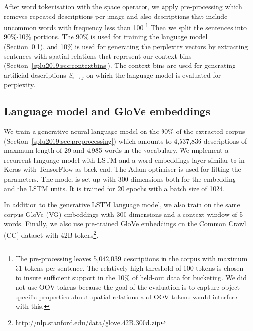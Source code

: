 After word
tokenisation with the space operator, we apply pre-processing which removes
repeated descriptions per-image and also descriptions that include uncommon
words with frequency less than 100%
\footnote{The pre-processing leaves 5,042,039 descriptions in the corpus with maximum 31 tokens per sentence. The relatively high threshold of 100 tokens is chosen to insure sufficient support in the 10\% of held-out data for bucketing. We did not use OOV tokens because the goal of the evaluation is to capture object-specific properties about spatial relations and OOV tokens would interfere with this.} %
Then we split the sentences into 90\%-10\%
portions. The 90\% is used for training the language model
(Section~\ref{splu2019:sec:training}), and 10\% is used for generating the perplexity
vectors by extracting sentences with spatial relations that represent our
context bins (Section~\ref{splu2019:sec:contextbins}). The context bins are used for
generating artificial descriptions $S_{i \to j}$ on which the language model is
evaluated for perplexity.%

\subsection{Language model and GloVe embeddings}\label{splu2019:sec:training}

We train a generative neural language model on the 90\% of the extracted corpus
(Section~\ref{splu2019:sec:preprocessing}) which amounts to 4,537,836 descriptions of
maximum length of 29 and 4,985 words in the vocabulary. We implement a
recurrent language model with LSTM \cite{hochreiter1997long} and a word
embeddings layer similar to \citet{gal2016theoretically} in Keras
\cite{chollet2015keras} with TensorFlow \cite{tensorflow2015-whitepaper} as
back-end.
The Adam optimiser \cite{kingma2014adam} is used for fitting the parameters.
The model is set up with 300 dimensions both for the embedding- and the LSTM
units. It is trained for 20 epochs with a batch size of 1024.

In addition to the generative LSTM language model, we also train on the same
corpus GloVe (VG) embeddings with 300 dimensions and a context-window of 5
words. Finally, we also use pre-trained GloVe embeddings on the Common Crawl
(CC) dataset with 42B tokens\footnote{\url{http://nlp.stanford.edu/data/glove.42B.300d.zip}}.


